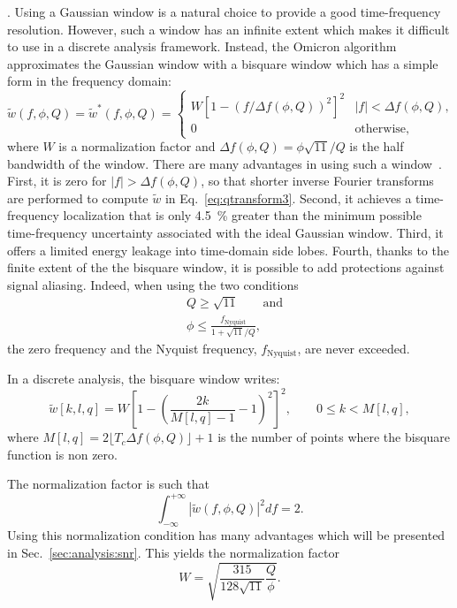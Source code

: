 . Using a Gaussian window is a natural choice to provide a good time-frequency resolution. However, such a window has an infinite extent which makes it difficult to use in a discrete analysis framework. Instead, the Omicron algorithm approximates the Gaussian window with a bisquare window which has a simple form in the frequency domain:
\begin{equation}
  \tilde{w}(f,\phi,Q) = \tilde{w}^*(f,\phi,Q) =
  \begin{cases}
    W\left[1 - \left(f/\Delta f(\phi,Q)\right)^2 \right]^2 & |f| < \Delta f(\phi,Q), \\
    0 & \textrm{otherwise},
  \end{cases}
  \label{eq:bisquare}
\end{equation}
where $W$ is a normalization factor and $\Delta f(\phi,Q)=\phi\sqrt{11}/Q$ is the half bandwidth of the window. There are many advantages in using such a window~\cite{Chatterji:2004}. First, it is zero for $|f| > \Delta f(\phi,Q)$, so that shorter inverse Fourier transforms are performed to compute $\tilde{w}$ in Eq.~\ref{eq:qtransform3}. Second, it achieves a time-frequency localization that is only 4.5~\% greater than the minimum possible time-frequency uncertainty associated with the ideal Gaussian window. Third, it offers a limited energy leakage into time-domain side lobes. Fourth, thanks to the finite extent of the the bisquare window, it is possible to add protections against signal aliasing. Indeed, when using the two conditions
\begin{align}
  &Q\ge\sqrt{11} \qquad \text{and}\label{eq:antialias1} \\
  &\phi \le \frac{f_{\text{Nyquist}}}{1+\sqrt{11}/Q}, \label{eq:antialias2}
\end{align}
the zero frequency and the Nyquist frequency, $f_{\text{Nyquist}}$, are never exceeded.

In a discrete analysis, the bisquare window writes:
\begin{equation}
  \tilde{w}[k,l,q] = W \left[1 - \left(\frac{2k}{M[l,q]-1}-1\right)^2 \right]^2, \qquad 0\le k < M[l,q],
  \label{eq:dbisquare}
\end{equation}
where $M[l,q] = 2\lfloor{T_c\Delta f(\phi,Q)\rfloor} +1$ is the number of points where the bisquare function is non zero.

The normalization factor is such that
\begin{equation}
  \int_{-\infty}^{+\infty}{|\tilde{w}(f,\phi,Q)|^2df} = 2.
  \label{eq:winnorm}
\end{equation}
Using this normalization condition has many advantages which will be presented in Sec.~\ref{sec:analysis:snr}. This yields the normalization factor
\begin{equation}
  W = \sqrt{\frac{315}{128\sqrt{11}} \frac{Q}{\phi}}.
  \label{eq:W}
\end{equation}

